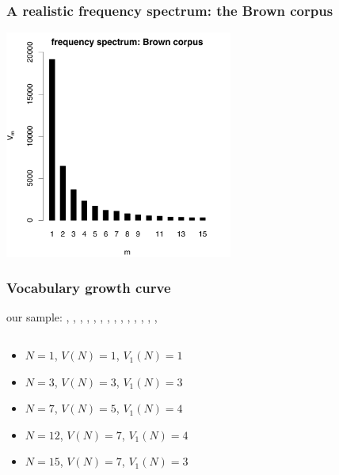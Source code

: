 \documentclass[handout,notes=show,t]{beamer} %
\begin{document}
\begin{frame}
  \frametitle{A realistic frequency spectrum: the Brown corpus}

  \ungap[1]
  \begin{center}
    \includegraphics[height=7.5cm]{../plots/tutorial_brown_spc}%
  \end{center}
\end{frame}

\begin{frame}
  \frametitle{Vocabulary growth curve}
  
    our sample: , \TA<2->{very}, , , , ,
  , , , , , ,
  , , 

  \begin{columns}[c]
    \begin{column}{6cm}
      \begin{itemize}
      \item<1-> $N = 1$, $V(N) = 1$, $V_1(N) = 1$
      \item<2-> $N = 3$, $V(N) = 3$, $V_1(N) = 3$
      \item<3-> $N = 7$, $V(N) = 5$, $V_1(N) = 4$
      \item<4-> $N = 12$, $V(N) = 7$, $V_1(N) = 4$
      \item<5-> $N = 15$, $V(N) = 7$, $V_1(N) = 3$
      \end{itemize}
    \end{column}
    \begin{column}{5cm}
    \end{column}
  \end{columns}

\end{frame}
\end{document}

